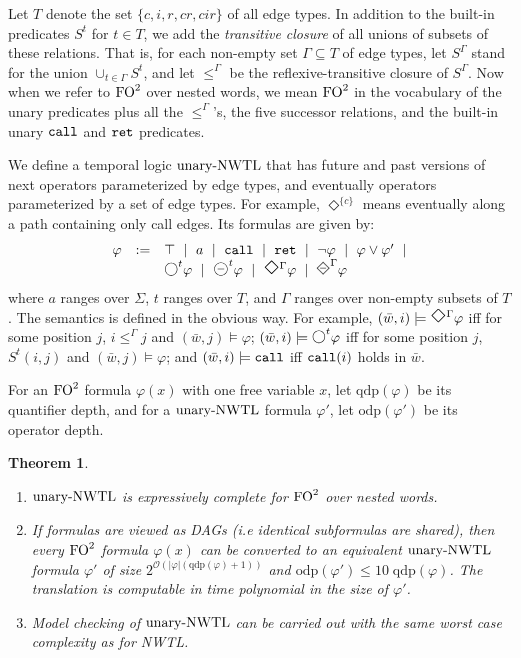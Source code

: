 \documentclass{LMCS}
\newcommand{\w}{{\bar{w}}}
\newcommand{\dm}{\Diamond}
\newcommand{\next}{\text{\raisebox{1pt}{$\bigcirc$}}}
\newcommand{\FO}{{\rm FO}}
\renewcommand{\phi}{\varphi}
\theoremstyle{plain}
\newtheorem{theorem}{Theorem}[section]
\theoremstyle{definition}
\newcommand{\qdp}[1]{\mathrm{qdp}(#1)}
\newcommand{\odp}[1]{\mathrm{odp}(#1)}
\newcommand{\ucaret}{\text{unary-}\caret}
\renewcommand{\ucaret}{\text{unary-}\nwtl}
\newcommand{\eventually}{\text{\Large $\Diamond$}}
\newcommand{\prev}{{\text{\Large $\mathbf{\circleddash}$}}}
\newcommand{\dmd}{{\qbezier(0,0)(0.5,0.5)(1,1) \qbezier(0,0)(-0.5,0.5)(-1,1)
    \qbezier(0,2)(0.5,1.5)(1,1) \qbezier(0,2)(-0.5,1.5)(-1,1)}}
\newcommand{\dmdminus}{{\unitlength1.5mm
    \begin{picture}(2.2,2)(-1,0)
      \dmd \put(-0.5,1){\line(1,0){1}}
    \end{picture}}}
\newcommand{\peventually}{\dmdminus}
\newcommand{\caret}{\text{CaRet}}
\newcommand{\retr}{\mathit{ret}}
\newcommand{\rett}{{\tt ret}}
\newcommand{\call}{{\tt call}}
\renewcommand{\retr}{\rett}
\newcommand{\dmminus}{\dm^-}
\renewcommand{\dm}{\next}
\renewcommand{\dmminus}{\prev}
\newcounter{example}
\begin{document}
Let $T$ denote the set $\{c,i,r,cr,cir\}$ of all edge types.
In addition to the built-in predicates $S^t$ for $t\in T$, we
add the {\em transitive closure} of all unions of subsets 
of these relations.
That is, for each non-empty set $\Gamma\subseteq T$ of 
edge types,  let $S^\Gamma$ stand for the union $\cup_{t\in\Gamma} S^t$,
and let $\leq^\Gamma$ be the reflexive-transitive closure of $S^\Gamma$.
Now when we refer to $\FO^2$ over nested words, we mean $\FO^2$ in the
 vocabulary of the unary predicates plus all the $\leq^\Gamma$'s,
the five successor relations, and the built-in unary $\call$ and $\retr$
predicates. 

We define a temporal logic $\ucaret$  that has
future and past versions of next operators parameterized by edge types,
and eventually operators parameterized
by a set of edge types. 
For example, $\Diamond^{\{c\}}$ means eventually along
a path containing only call edges.
Its formulas are given by:
$$
\begin{array}{rcl} 
  \phi & := &  \top\ \mid\ a \ \mid\ \call\ \mid\ \retr\ \mid \ \neg \phi \ 
\mid \ \phi \vee \phi' \
  \mid \\ 
&& \dm^t \phi \ \mid  \ \dmminus^t \phi \ \mid\  \eventually^\Gamma \phi \ 
\mid \   \peventually^\Gamma \phi
\end{array}
$$
where $a$ ranges over $\Sigma$, $t$ ranges over $T$,  and $\Gamma$ ranges over non-empty subsets of 
$T$. 
The semantics is defined in the obvious way.  For example,
$(\w,i) \models \eventually^\Gamma \varphi$ iff 
for some position $j$,  $i \leq^{\Gamma} j$ and 
$(\w,j)\models \varphi$; $(\w,i) \models \dm^t \varphi$ 
iff for some position $j$, $S^t(i,j)$  and $(\w,j) \models \varphi$;
and $(\w,i) \models \call$ iff $\call(i)$ holds in $\w$.


For an $\FO^2$ formula $\phi(x)$ with one free variable $x$, let
$\qdp{\phi}$ be its quantifier depth,
and for a $\ucaret$ formula $\phi'$,  let $\odp{\phi'}$ 
be its operator depth.

\begin{theorem} 
  \label{translation theorem}\hfil
\begin{enumerate}[\em(1)]
\item  {$\ucaret$} is expressively complete for $\FO^2$ over nested words.

\item If formulas are viewed as DAGs (i.e identical subformulas are shared), then
every $\FO^2$ formula $\phi(x)$ can be converted to an equivalent
  {$\ucaret$} formula $\phi'$
of size $2^{\mathcal O(|\phi| (\qdp \phi + 1))}$ and $\odp{\phi'} \leq  
10 \; \qdp \phi$.
  The translation is computable in time polynomial in
  the size of $\phi'$.
\item Model checking of $\ucaret$ can be carried out with the
same worst case complexity as for NWTL.
\end{enumerate}
\end{theorem}
\end{document}
